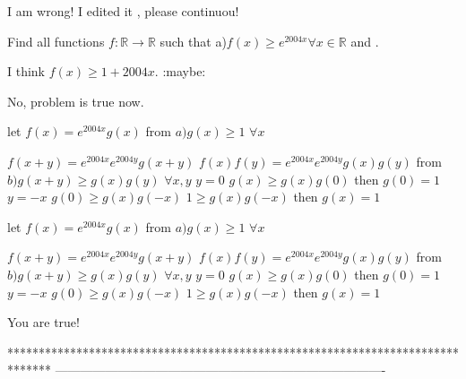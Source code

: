 \begin{mysolution}
	I am wrong! I edited it , please continuou!  
\end{mysolution}



\begin{mysolution}
	\begin{tcolorbox}Find all functions $ f: \mathbb{R}\to\mathbb{R}$ such that 
a)$ f(x)\geq e^{2004x}\forall x\in\mathbb{R}$ and .\end{tcolorbox}

I think $ f(x)\geq 1+2004x$. :maybe:
\end{mysolution}



\begin{mysolution}
	No, problem is true now.
\end{mysolution}



\begin{mysolution}let $ f(x)=e^{2004x}g(x)$  from $ a) g(x)\geq 1$ $ \forall x$

$ f(x+y)=e^{2004x}e^{2004y}g(x+y)$
$ f(x) f(y) = e^{2004x}e^{2004y}g(x) g(y)$
from $ b) g(x+y) \geq g(x)g(y)$ $ \forall x,y$
$ y=0$ $ g(x)\geq  g(x) g(0)$ 
then $ g(0)=1$
$ y=-x$ $ g(0)\geq  g(x) g(-x)$
$ 1\geq  g(x) g(-x)$
then $ g(x)=1$
\end{mysolution}



\begin{mysolution}
	\begin{tcolorbox}let $ f(x)=e^{2004x}g(x)$  from $ a) g(x)\geq 1$ $ \forall x$

$ f(x+y)=e^{2004x}e^{2004y}g(x+y)$
$ f(x) f(y) = e^{2004x}e^{2004y}g(x) g(y)$
from $ b) g(x+y) \geq g(x)g(y)$ $ \forall x,y$
$ y=0$ $ g(x)\geq g(x) g(0)$ 
then $ g(0)=1$
$ y=-x$ $ g(0)\geq g(x) g(-x)$
$ 1\geq g(x) g(-x)$
then $ g(x)=1$\end{tcolorbox}
You are true!  
\end{mysolution}
*******************************************************************************
-------------------------------------------------------------------------------

